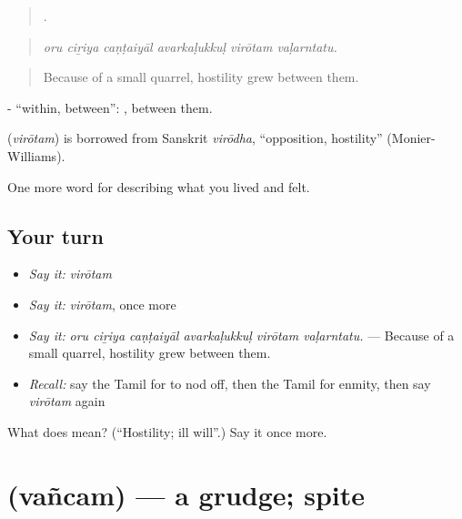 \begin{quote}
     .
\end{quote}

\begin{quote}
\emph{oru ciṟiya caṇṭaiyāl avarkaḷukkuḷ virōtam vaḷarntatu.}
\end{quote}

\begin{quote}
Because of a small quarrel, hostility grew between them.
\end{quote}

- \textquotedblleft{}within, between\textquotedblright{}: , between them.

\begin{cousinweb}
\textbf{} (\emph{virōtam}) is borrowed from Sanskrit \emph{virōdha}, \textquotedblleft{}opposition, hostility\textquotedblright{} (Monier-Williams).
\end{cousinweb}

\begin{grammarlens}[title={What you've built}]
One more word for describing what you lived and felt.
\end{grammarlens}

\subsection*{Your turn}
\begin{itemize}
\raggedright
  \item \emph{Say it:} \emph{virōtam}
  \item \emph{Say it:} \emph{virōtam}, once more
  \item \emph{Say it:} \emph{oru ciṟiya caṇṭaiyāl avarkaḷukkuḷ virōtam vaḷarntatu.} — Because of a small quarrel, hostility grew between them.
  \item \emph{Recall:} say the Tamil for to nod off, then the Tamil for enmity, then say \emph{virōtam} again
\end{itemize}

\begin{tcolorbox}[breakable,colback=teal!4,colframe=teal!35!black,title={Before you move on}]
What does  mean? (\textquotedblleft{}Hostility; ill will\textquotedblright{}.) Say it once more.
\end{tcolorbox}
\section[\texorpdfstring{\ta{வஞ்சம்} (vañcam)}{வஞ்சம் (vañcam)}]{ (vañcam) — a grudge; spite}

